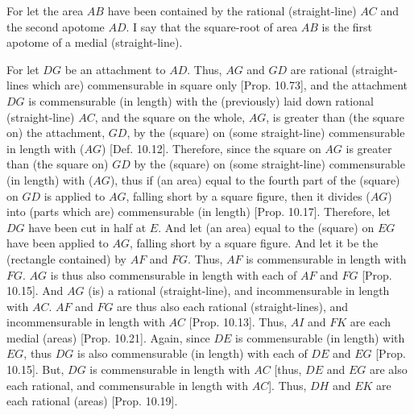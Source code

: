 \begin{Parallel}{}{}
{For let the area $AB$ have been contained by the rational (straight-line) $AC$ and the second apotome $AD$. I say that the square-root of area $AB$ is the first apotome of a medial (straight-line).

For let $DG$ be an attachment to $AD$. Thus, $AG$ and $GD$
are rational (straight-lines which are) commensurable in square only [Prop. 10.73],
and the attachment $DG$ is commensurable (in length) with the
(previously) laid down rational (straight-line) $AC$, and the square on
the whole, $AG$, is greater than (the square on) the attachment, $GD$,
by the (square) on (some straight-line) commensurable in length with ($AG$) 
[Def. 10.12]. Therefore, since the square on $AG$ is
greater than (the square on) $GD$ by the (square) on (some
straight-line) commensurable (in length) with ($AG$), thus if  (an area)
equal to the fourth part of the (square) on $GD$ is applied
to $AG$, falling short by a square figure, then it divides ($AG$) into (parts which
are) commensurable (in length) [Prop. 10.17]. 
Therefore, let $DG$ have been cut in half at $E$. And let (an area) equal to
the (square) on $EG$ have been applied to $AG$, falling short
by a square figure. And let it be the (rectangle contained) by $AF$ and $FG$.
Thus, $AF$ is commensurable in length with $FG$. $AG$ is thus
also commensurable in length with each of $AF$ and $FG$ [Prop. 10.15]. And $AG$ (is) a rational (straight-line), and incommensurable in length with $AC$. $AF$ and $FG$
are thus also each rational (straight-lines), and incommensurable in length with
$AC$ [Prop. 10.13].
Thus, $AI$
and $FK$ are each medial (areas) [Prop. 10.21]. 
Again, since $DE$ is commensurable (in length) with $EG$, thus
$DG$ is also commensurable (in length) with each of $DE$ and $EG$ [Prop. 10.15]. But, $DG$ is commensurable
in length with $AC$ [thus, $DE$ and $EG$ are also each rational, and
commensurable in length with $AC$]. Thus, $DH$ and $EK$ are each
rational (areas) [Prop. 10.19].

}
\end{Parallel}
